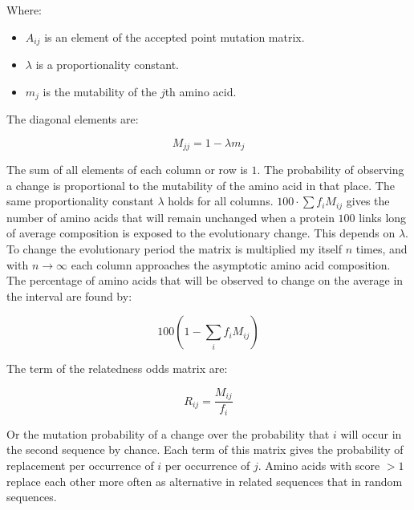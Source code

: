 Where:

\begin{multicols}{2}
	\begin{itemize}
		\item $A_{ij}$ is an element of the accepted point mutation matrix.
		\item $\lambda$ is a proportionality constant.
		\item $m_j$ is the mutability of the $j$th amino acid.
	\end{itemize}
\end{multicols}

The diagonal elements are:

$$M_{jj} = 1-\lambda m_j$$

The sum of all elements of each column or row is $1$.
The probability of observing a change is proportional to the mutability of the amino acid in that place.
The same proportionality constant $\lambda$ holds for all columns.
$100\cdot\sum f_iM_{ij}$ gives the number of amino acids that will remain unchanged when a protein $100$ links long of average composition is exposed to the evolutionary change.
This depends on $\lambda$.
To change the evolutionary period the matrix is multiplied my itself $n$ times, and with $n \rightarrow \infty$ each column approaches the asymptotic amino acid composition.
The percentage of amino acids that will be observed to change on the average in the interval are found by:

$$100(1-\sum\limits_if_iM_{ij})$$

The term of the relatedness odds matrix are:

$$R_{ij} = \frac{M_{ij}}{f_i}$$

Or the mutation probability of a change over the probability that $i$ will occur in the second sequence by chance.
Each term of this matrix gives the probability of replacement per occurrence of $i$ per occurrence of $j$.
Amino acids with score $>1$ replace each other more often as alternative in related sequences that in random sequences.
